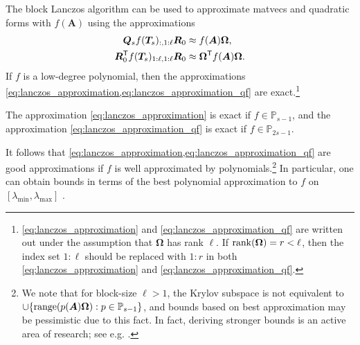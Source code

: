 The block Lanczos algorithm can be used to approximate matvecs and quadratic forms with $f(\bm{A})$ using the approximations
\begin{align}\label{eq:lanczos_approximation}
    \bm{Q}_s f(\bm{T}_s)_{:,1:\ell}\bm{R}_0 &\approx f(\bm{A}) \bm{\Omega},
    \\
    \label{eq:lanczos_approximation_qf}
    \bm{R}_0^{\textsf{\textup{T}}} f(\bm{T}_s)_{1:\ell,1:\ell}\bm{R}_0 &\approx \bm{\Omega}^{\textsf{\textup{T}}} f(\bm{A}) \bm{\Omega}. 
\end{align}
If $f$ is a low-degree polynomial, then the approximations \cref{eq:lanczos_approximation,eq:lanczos_approximation_qf} are exact.\footnote{\eqref{eq:lanczos_approximation} and \eqref{eq:lanczos_approximation_qf} are written out under the assumption that $\bm{\Omega}$ has rank $\ell$. If $\operatorname{rank}(\bm{\Omega}) = r <\ell$, then the index set $1:\ell$ should be replaced with $1:r$ in both \eqref{eq:lanczos_approximation} and \eqref{eq:lanczos_approximation_qf}.} 
%
\begin{lemma}\label{lemma:block_lanczos_exact}
The approximation \cref{eq:lanczos_approximation} is exact if $f\in\mathbb{P}_{s-1}$, and the approximation \cref{eq:lanczos_approximation_qf} is exact if $f\in \mathbb{P}_{2s-1}$.
\end{lemma}
It follows that \cref{eq:lanczos_approximation,eq:lanczos_approximation_qf} are good approximations if $f$ is well approximated by polynomials.\footnote{We note that for block-size $\ell>1$, the Krylov subspace is not equivalent to $\cup\{\operatorname{range}(p(\bm{A}) \bm{\Omega}) : p \in \mathbb{P}_{s-1}\}$, and bounds based on best approximation may be pessimistic due to this fact.
In fact, deriving stronger bounds is an active area of research; see e.g. \cite{chen_greenbaum_musco_musco,frommer_schweitzer_guttel,frommer_lund_szyld_20,frommer_schweitzer,frommer_simoncini, hochbruck_lubich}. 
}
In particular, one can obtain bounds in terms of the best polynomial approximation to $f$ on $[\lambda_{\min},\lambda_{\max}]$ \cite{Saad:1992,OrecchiaSachdevaVishnoi:2012,Amsel:2024}.


